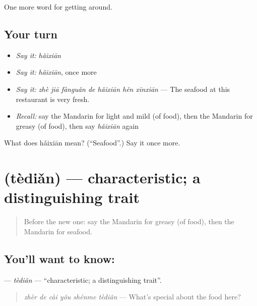 \begin{grammarlens}[title={What you've built}]
One more word for getting around.
\end{grammarlens}

\subsection*{Your turn}
\begin{itemize}
\raggedright
  \item \emph{Say it:} \emph{hǎixiān}
  \item \emph{Say it:} \emph{hǎixiān}, once more
  \item \emph{Say it:} \emph{zhè jiā fànguǎn de hǎixiān hěn xīnxiān} — The seafood at this restaurant is very fresh.
  \item \emph{Recall:} say the Mandarin for light and mild (of food), then the Mandarin for greasy (of food), then say \emph{hǎixiān} again
\end{itemize}

\begin{tcolorbox}[breakable,colback=teal!4,colframe=teal!35!black,title={Before you move on}]
What does hǎixiān mean? (\textquotedblleft{}Seafood\textquotedblright{}.) Say it once more.
\end{tcolorbox}
\section[\texorpdfstring{\zh{特点} (tèdiǎn)}{特点 (tèdiǎn)}]{ (tèdiǎn) — characteristic; a distinguishing trait}

\label{lesson:ZH-C450-tedian}



\begin{quote}
Before the new one: say the Mandarin for greasy (of food), then the Mandarin for seafood.
\end{quote}

\subsection*{You'll want to know: }
\textbf{} — \emph{tèdiǎn} — \textquotedblleft{}characteristic; a distinguishing trait\textquotedblright{}.

\begin{quote}
\textbf{} \emph{zhèr de cài yǒu shénme tèdiǎn} — What's special about the food here?
\end{quote}

